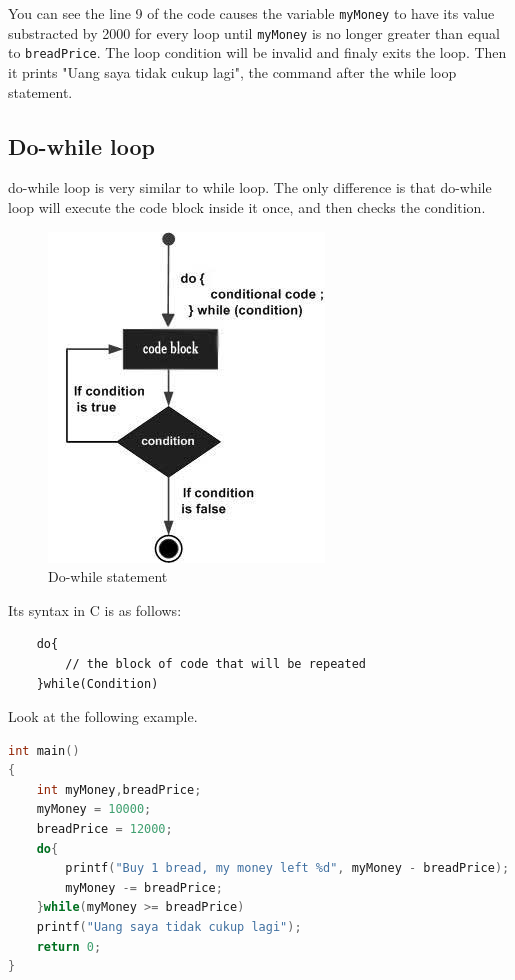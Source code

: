 You can see the line 9 of the code causes the variable \verb|myMoney| to have its value substracted by 2000 for every loop until \verb|myMoney| is no longer greater than equal to \verb|breadPrice|.
The loop condition will be invalid and finaly exits the loop. Then it prints "Uang saya tidak cukup lagi", the command after the while loop statement.
\subsection{Do-while loop}
do-while loop is very similar to while loop. The only difference is that do-while loop will execute the code block inside it once, and then checks the condition.
\begin{figure}[H]
	\centering
	\includegraphics[width=0.4\linewidth]{P2/img/dowhileloop.png}
	\caption{Do-while statement}
	\label{fig:dowhileloop}
\end{figure}
Its syntax in C is as follows:
\begin{verbatim}
    do{
        // the block of code that will be repeated
    }while(Condition)
\end{verbatim}
Look at the following example.
\begin{lstlisting}[language=c,caption = Do-while implementation example,label=lst:dowhileexample01]
int main()
{
	int myMoney,breadPrice;
	myMoney = 10000;
	breadPrice = 12000;
	do{
	    printf("Buy 1 bread, my money left %d", myMoney - breadPrice);
	    myMoney -= breadPrice;
	}while(myMoney >= breadPrice)
	printf("Uang saya tidak cukup lagi");
	return 0;
}
\end{lstlisting}
